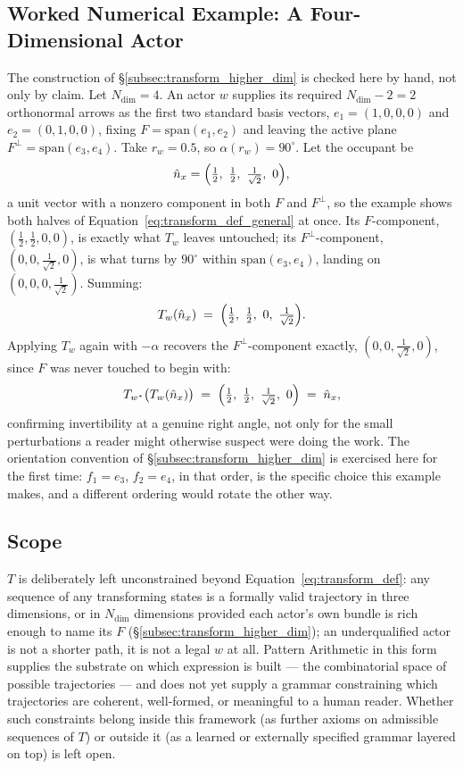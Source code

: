 \documentclass[12pt, a4paper]{article}
\begin{document}
\subsection{Worked Numerical Example: A Four-Dimensional Actor}
\label{subsec:transform_example_4d}
The construction of \S\ref{subsec:transform_higher_dim} is checked
here by hand, not only by claim. Let $N_{\mathrm{dim}}=4$. An actor
$w$ supplies its required $N_{\mathrm{dim}}-2=2$ orthonormal arrows as
the first two standard basis vectors, $e_1=(1,0,0,0)$ and
$e_2=(0,1,0,0)$, fixing $F=\mathrm{span}(e_1,e_2)$ and leaving the
active plane $F^\perp=\mathrm{span}(e_3,e_4)$. Take $r_w=0.5$, so
$\alpha(r_w)=90^\circ$. Let the occupant be
\[
\hat n_x = \Bigl(\tfrac12,\ \tfrac12,\ \tfrac{1}{\sqrt2},\ 0\Bigr),
\]
a unit vector with a nonzero component in both $F$ and $F^\perp$, so
the example shows both halves of Equation~\eqref{eq:transform_def_general}
at once. Its $F$-component, $(\tfrac12,\tfrac12,0,0)$, is exactly
what $T_w$ leaves untouched; its $F^\perp$-component,
$(0,0,\tfrac{1}{\sqrt2},0)$, is what turns by $90^\circ$ within
$\mathrm{span}(e_3,e_4)$, landing on $(0,0,0,\tfrac{1}{\sqrt2})$.
Summing:
\begin{equation}
    T_w(\hat n_x) \;=\; \Bigl(\tfrac12,\ \tfrac12,\ 0,\ \tfrac{1}{\sqrt2}\Bigr).
\end{equation}
Applying $T_w$ again with $-\alpha$ recovers the $F^\perp$-component
exactly, $(0,0,\tfrac{1}{\sqrt2},0)$, since $F$ was never touched to
begin with:
\begin{equation}
    T_{w^*}\bigl(T_w(\hat n_x)\bigr) \;=\; \Bigl(\tfrac12,\ \tfrac12,\ \tfrac{1}{\sqrt2},\ 0\Bigr) \;=\; \hat n_x,
\end{equation}
confirming invertibility at a genuine right angle, not only for the
small perturbations a reader might otherwise suspect were doing the
work. The orientation convention of
\S\ref{subsec:transform_higher_dim} is exercised here for the first
time: $f_1=e_3$, $f_2=e_4$, in that order, is the specific choice
this example makes, and a different ordering would rotate the other
way.

\subsection{Scope}
\label{subsec:transform_scope}
$T$ is deliberately left unconstrained beyond
Equation~\eqref{eq:transform_def}: any sequence of any transforming
states is a formally valid trajectory in three dimensions, or in
$N_{\mathrm{dim}}$ dimensions provided each actor's own bundle is
rich enough to name its $F$ (\S\ref{subsec:transform_higher_dim}); an
underqualified actor is not a shorter path, it is not a legal $w$ at
all. Pattern Arithmetic in this form
supplies the substrate on which expression is built --- the
combinatorial space of possible trajectories --- and does not yet
supply a grammar constraining which trajectories are coherent,
well-formed, or meaningful to a human reader. Whether such constraints
belong inside this framework (as further axioms on admissible
sequences of $T$) or outside it (as a learned or externally specified
grammar layered on top) is left open.
\end{document}
